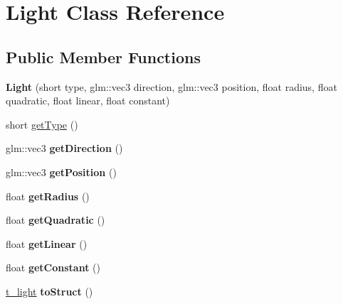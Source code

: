 \hypertarget{class_light}{}\section{Light Class Reference}
\label{class_light}
\subsection*{Public Member Functions}
\begin{DoxyCompactItemize}
\item 
{\bfseries Light} (short type, glm\+::vec3 direction, glm\+::vec3 position, float radius, float quadratic, float linear, float constant)\hypertarget{class_light_a26abeeeb04bb0d501cc7dab5aaa3f81f}{}\label{class_light_a26abeeeb04bb0d501cc7dab5aaa3f81f}

\item 
short \hyperlink{class_light_aefdd21a77a725c1676bd10717cfca838}{get\+Type} ()
\item 
glm\+::vec3 {\bfseries get\+Direction} ()\hypertarget{class_light_ae10c348537ea57b655960f027731fbf3}{}\label{class_light_ae10c348537ea57b655960f027731fbf3}

\item 
glm\+::vec3 {\bfseries get\+Position} ()\hypertarget{class_light_a7b29978fecfaaf90586a812c8f9648cd}{}\label{class_light_a7b29978fecfaaf90586a812c8f9648cd}

\item 
float {\bfseries get\+Radius} ()\hypertarget{class_light_a796d2ff750ba0ce24ebc4a77d897ac71}{}\label{class_light_a796d2ff750ba0ce24ebc4a77d897ac71}

\item 
float {\bfseries get\+Quadratic} ()\hypertarget{class_light_a00c361277bfc6806c18126f665f64e74}{}\label{class_light_a00c361277bfc6806c18126f665f64e74}

\item 
float {\bfseries get\+Linear} ()\hypertarget{class_light_ae34e98dd8c41d62a7e523442046dd9cc}{}\label{class_light_ae34e98dd8c41d62a7e523442046dd9cc}

\item 
float {\bfseries get\+Constant} ()\hypertarget{class_light_a2ce9f92eb7b1ecf6c2ec1af1f0e9005a}{}\label{class_light_a2ce9f92eb7b1ecf6c2ec1af1f0e9005a}

\item 
\hyperlink{structt__light}{t\+\_\+light} {\bfseries to\+Struct} ()\hypertarget{class_light_a456e1b15f272fe5e0a26af199b2be6f8}{}\label{class_light_a456e1b15f272fe5e0a26af199b2be6f8}


\end{DoxyCompactItemize}

